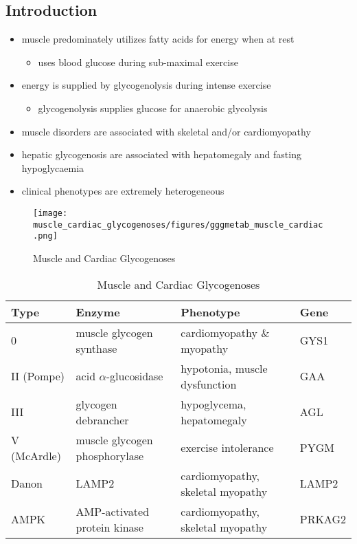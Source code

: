 \documentclass[12pt]{scrartcl}
\begin{document}
\subsection{Introduction}
\label{sec:org6cb0106}
\begin{itemize}
\item muscle predominately utilizes fatty acids for energy when at rest
\begin{itemize}
\item uses blood glucose during sub-maximal exercise
\end{itemize}
\item energy is supplied by glycogenolysis during intense exercise
\begin{itemize}
\item glycogenolysis supplies glucose for anaerobic glycolysis
\end{itemize}
\item muscle disorders are associated with skeletal and/or
cardiomyopathy
\item hepatic glycogenosis are associated with hepatomegaly and fasting
hypoglycaemia
\item clinical phenotypes are extremely heterogeneous
\end{itemize}

\begin{figure}[htbp]
\centering
\texttt{[image: muscle\_cardiac\_glycogenoses/figures/gggmetab\_muscle\_cardiac.png]}
\caption[Muscle and Cardiac Glycogenoses]{\label{fig:org7868e78}Muscle and Cardiac Glycogenoses}
\end{figure}

\begin{table}[htbp]
\caption{\label{tab:org2a223ca}Muscle and Cardiac Glycogenoses}
\centering
\begin{tabular}{llll}
Type & Enzyme & Phenotype & Gene\\
\hline
0 & muscle glycogen synthase & cardiomyopathy \& myopathy & GYS1\\
II (Pompe) & acid \(\alpha\)-glucosidase & hypotonia, muscle dysfunction & GAA\\
III & glycogen debrancher & hypoglycema, hepatomegaly & AGL \footnotemark\\
V (McArdle) & muscle glycogen phosphorylase & exercise intolerance & PYGM\\
Danon & LAMP2 & cardiomyopathy, \textpm{} skeletal myopathy & LAMP2\\
AMPK & AMP-activated protein kinase & cardiomyopathy, \textpm{} skeletal myopathy & PRKAG2\\
\end{tabular}
\end{table}
\end{document}
